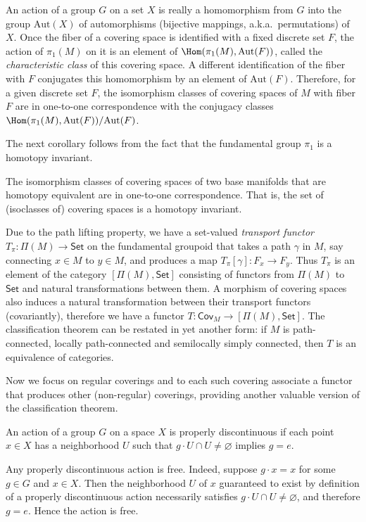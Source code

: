 \begin{rem}
    An action of a group $G$ on a set $X$ is really a homomorphism from $G$ into the group $\mathrm{Aut}(X)$ of automorphisms (bijective mappings, a.k.a.~permutations) of $X$. Once the fiber of a covering space is identified with a fixed discrete set $F$, the action of $\pi_1(M)$ on it is an element of $\Hom(\pi_1(M),\mathrm{Aut}(F))$, called the \emph{characteristic class} of this covering space. A different identification of the fiber with $F$ conjugates this homomorphism by an element of $\mathrm{Aut}(F)$. Therefore, for a given discrete set $F$, the isomorphism classes of covering spaces of $M$ with fiber $F$ are in one-to-one correspondence with the conjugacy classes $\Hom(\pi_1(M),\mathrm{Aut}(F))\slash \mathrm{Aut}(F)$.
\end{rem}

The next corollary follows from the fact that the fundamental group $\pi_1$ is a homotopy invariant.
\begin{cor}
    The isomorphism classes of covering spaces of two base manifolds that are homotopy equivalent are in one-to-one correspondence. That is, the set of (isoclasses of) covering spaces is a homotopy invariant. 
\end{cor}


\begin{rem}
    Due to the path lifting property, we have a set-valued \emph{transport functor} $T_\pi:\Pi(M)\to \mathsf{Set}$ on the fundamental groupoid that takes a path $\gamma$ in $M$, say connecting $x\in M$ to $y\in M$, and produces a map $T_\pi[\gamma]:F_x\to F_y$. Thus $T_\pi$ is an element of the category $[\Pi(M),\mathsf{Set}]$ consisting of functors from $\Pi(M)$ to $\mathsf{Set}$ and natural transformations between them. A morphism of covering spaces also induces a natural transformation between their transport functors (covariantly), therefore we have a functor $T:\mathsf{Cov}_M\to [\Pi(M),\mathsf{Set}]$. The classification theorem can be restated in yet another form: if $M$ is path-connected, locally path-connected and semilocally simply connected, then $T$ is an equivalence of categories.
\end{rem}


Now we focus on regular coverings and to each such covering associate a functor that produces other (non-regular) coverings, providing another valuable version of the classification theorem. 

\begin{defn}
    An action of a group $G$ on a space $X$ is properly discontinuous if each point $x\in X$ has a neighborhood $U$ such that $g\cdot U\cap U\neq \varnothing$ implies $g=e$.
\end{defn}
\begin{rem}
    Any properly discontinuous action is free. Indeed, suppose $g\cdot x=x$ for some $g\in G$ and $x\in X$. Then the neighborhood $U$ of $x$ guaranteed to exist by definition of a properly discontinuous action necessarily satisfies $g\cdot U\cap U\neq\varnothing$, and therefore $g=e$. Hence the action is free.
\end{rem}


